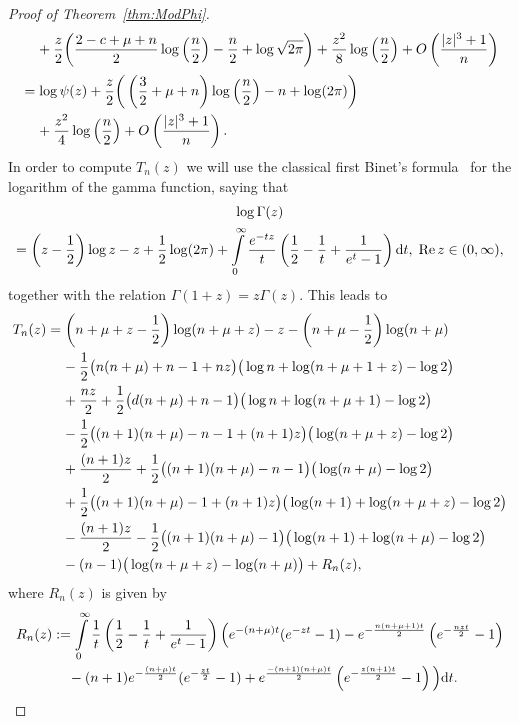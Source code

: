 \documentclass[10pt]{amsart}
\theoremstyle{definition}\newtheorem{defi}[theo]{Definition}\newtheorem{rema}[theo]{Remark}\newtheorem{exam}[theo]{Example}\newtheorem{exem}[theo]{Example}\newtheorem{nota}[theo]{Notation}
\newcommand{\dd}{{\rm d}}
\renewcommand{\Re}{\text{Re}\,}
\begin{document}
\begin{proof}[Proof of Theorem~\ref{thm:ModPhi}]
\begin{align*}
&\mkern20mu +\frac{z}{2}\bigg(\frac{2-c+\mu+n}{2}\log\left(\frac{n}{2}\right)-\frac{n}{2}+\log\sqrt{2\pi}\bigg)+\frac{z^2}{8}\log\left(\frac{n}{2}\right)+O\left(\frac{|z|^3+1}{n}\right)\\[0.20em]
&=\log \psi(z)+ \frac{z}{2}\bigg(\left(\frac{3}{2}+\mu+n\right)\log\left(\frac{n}{2}\right)-n+\log(2\pi)\bigg)\\
&\mkern20mu +\frac{z^2}{4}\log\left(\frac{n}{2}\right)+O\left(\frac{|z|^3+1}{n}\right).
\end{align*}
In order to compute $T_n(z)$ we will use the classical first Binet's formula~\cite[p.~243]{WW} for the logarithm of the gamma function, saying that
\begin{multline*}
\log \Gamma(z)\\
=\left(z-\frac{1}{2}\right)\log z-z+\frac{1}{2}\log(2\pi)+\int\limits_{0}^{\infty}\frac{e^{-tz}}{t}\left(\frac{1}{2}-\frac{1}{t}+\frac{1}{e^t-1}\right)\dd t,\; \Re z\in(0,\infty),
\end{multline*}
together with the relation $\Gamma(1+z)=z\Gamma(z)$. This leads to
\begin{align*}
T_n(z)&=\left(n+\mu+z-\frac{1}{2}\right)\log (n+\mu+z)-z-\left(n+\mu-\frac{1}{2}\right)\log (n+\mu)\\
&\mkern20mu -\frac{1}{2}\big(n(n+\mu)+n-1+nz\big)\big(\log n +\log (n+\mu+1+z)-\log 2\big)\\
&\mkern20mu +\frac{nz}{2}+\frac{1}{2}\big(d(n+\mu)+n-1\big)\big(\log n +\log (n+\mu+1)-\log 2\big)\\
&\mkern20mu -\frac{1}{2}\big((n+1)(n+\mu)-n-1+(n+1)z\big)\big(\log(n+\mu+z)-\log 2\big)\\
&\mkern20mu +\frac{(n+1)z}{2}+\frac{1}{2}\big((n+1)(n+\mu)-n-1\big)\big(\log (n+\mu)-\log 2\big)\\
&\mkern20mu +\frac{1}{2}\big((n+1)(n+\mu)-1+(n+1)z\big)\big(\log (n+1)+\log(n+\mu+z)-\log 2\big)\\
&\mkern20mu -\frac{(n+1)z}{2}-\frac{1}{2}\big((n+1)(n+\mu)-1\big)\big(\log (n+1)+\log(n+\mu)-\log 2\big)\\
&\mkern20mu -(n-1)\big(\log(n+\mu+z)-\log(n+\mu)\big)+R_n(z),
\end{align*}
where $R_n(z)$ is given by
\begin{align*}
R_n(z)&:=\int\limits_{0}^{\infty}\frac{1}{t}\left(\frac{1}{2}-\frac{1}{t}+\frac{1}{e^t-1}\right)\Big(e^{-(n+\mu)t}(e^{-zt}-1)-e^{-\frac{n(n+\mu+1)t}{2}}\left(e^{-\frac{nzt}{2}}-1\right)\\
&\mkern20mu -(n+1)e^{-\frac{(n+\mu)t}{2}}(e^{-\frac{zt}{2}}-1)+e^\frac{-(n+1)(n+\mu)t}{2}\left(e^{-\frac{z(n+1)t}{2}}-1\right)\Big)\dd t.
\end{align*}



\end{proof}
\end{document}
